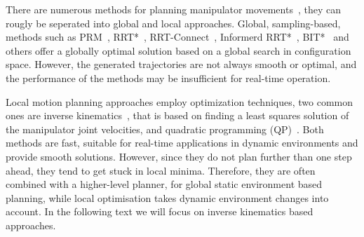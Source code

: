 \documentclass[letterpaper, 10 pt, conference]{ieeeconf}  %
\begin{document}
There are numerous methods for planning manipulator movements~\cite{c51, c52}, they can rougly be seperated into global and local approaches. Global, sampling-based, methods such as PRM~\cite{vsvestka1997motion}, RRT*~\cite{lavalle1998rapidly, karaman2010incremental}, RRT-Connect~\cite{kuffner2000rrt}, Informerd RRT*~\cite{gammell2014informed}, BIT*~\cite{gammell2015batch} and others offer a globally optimal solution based on a global search in configuration space. However, the generated trajectories are not always smooth or optimal, and the performance of the methods may be insufficient for real-time operation.





Local motion planning approaches employ optimization techniques, two common ones are inverse kinematics~\cite{c29,c38}, that is based on finding a least squares solution of the manipulator joint velocities, and quadratic programming (QP)~\cite{c21,c22,c23}.  Both methods are fast, suitable for real-time applications in dynamic environments and provide smooth solutions. However, since they do not plan further than one step ahead, they tend to get stuck in local minima. Therefore, they are often combined with a higher-level planner, for global static environment based  planning, while local optimisation takes dynamic environment changes into account. In the following text we will focus on inverse kinematics based approaches.
\end{document}
